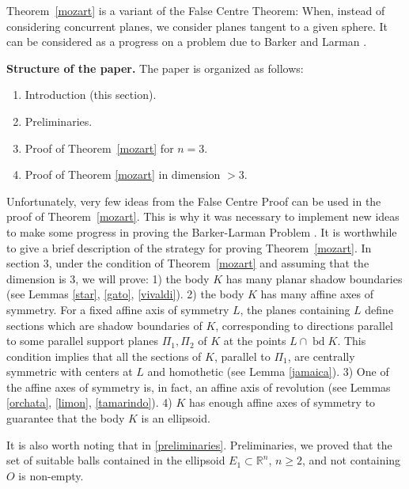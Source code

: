 \documentclass[12pt]{amsart}
\newcommand{\bd}{\operatorname*{bd}}
\newcommand{\Rn}{\mathbb{R}^{n}}
\begin{document}
                    Theorem~\ref{mozart} is a variant of the 
                    False Centre Theorem: When, instead of considering concurrent planes, we consider 
                    planes tangent to a given sphere. It can be considered as a progress on a problem 
                    due to Barker and Larman \cite{Barker}.  

                     \textbf{Structure of the paper.} The paper is organized as follows:
\begin{enumerate}
	\item [1.] Introduction (this section).
	\item [2.] Preliminaries.
        \item [3.] Proof of Theorem~\ref{mozart} for $n = 3$.
	\item [4.] Proof of Theorem \ref{mozart} in dimension $>3$. 
 \end{enumerate} 
                   Unfortunately, very few ideas from the False 
                   Centre Proof can be used in the proof of Theorem~\ref{mozart}. This is why it was 
                   necessary to implement new ideas to make some progress in proving the 
                   Barker-Larman Problem \cite{Barker}. It is worthwhile to give a brief description of 
                   the strategy for proving Theorem~\ref{mozart}.  In section 3, under the condition 
                   of Theorem~\ref{mozart} and assuming that the dimension is 3, 
                   we will prove: 1) the body $K$ has many planar shadow boundaries (see Lemmas 
                   \ref{star}, \ref{gato}, \ref{vivaldi}). 2) the body $K$ has many affine axes of symmetry. 
                   For a fixed affine axis of symmetry $L$, the planes containing $L$ define sections 
                   which are shadow boundaries of $K$, corresponding to directions parallel to some 
                   parallel support planes 
                   $\Pi_1, \Pi_2$
                   of $K$ at the points $L\cap \bd K$. This condition implies that all the sections of $K$, 
                   parallel to $\Pi_1$, are centrally symmetric with centers at $L$ and homothetic (see 
                   Lemma \ref{jamaica}). 
                   3) One of the affine axes of symmetry is, in fact, an affine axis of 
                   revolution (see Lemmas \ref{orchata}, \ref{limon}, \ref{tamarindo}). 4) $K$ has 
                   enough affine axes of symmetry to guarantee that the body $K$ is an ellipsoid.
                   
                   It is also worth noting that in \ref{preliminaries}. Preliminaries, we proved that 
                   the set of suitable balls contained in the ellipsoid $E_1\subset \Rn$, $n\geq 2$, 
                   and not containing $O$ is non-empty.
                  
\end{document}
